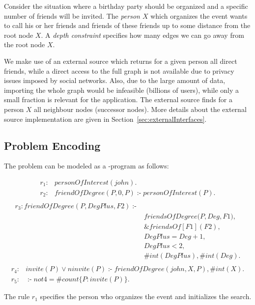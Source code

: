 \documentclass[14pt,a4paper, titlepage]{article}
\newcommand{\ext}[3]{\ensuremath{\&{#1}[#2](#3)}}
\DeclareMathOperator{\leftimpl}{:-}
\begin{document}
Consider the situation where a birthday party should be organized and a specific number of friends will
 be invited. The \emph{person $X$} which organizes the event wants to call his or her friends and friends of these friends up to some distance from the root node $X$. A \emph{depth constraint} specifies how many edges we can go away from the root node $X$.
 

We make use of an external source which returns for a given person all direct friends, while a direct access to the full graph is not available due to privacy issues imposed by social networks. Also, due to the large amount of data, importing the whole graph would be infeasible (billions of users), while only a small fraction is relevant for the application. The external source finds for a person $X$ all neighbour nodes (successor nodes). More details about the external source implementation are given in Section~\ref{sec:externalInterfaces}. 
               

\subsection{Problem Encoding}
The problem can be modeled as a \hex{}-program as follows:
\begin{exmp}
\begin{align*}
r_1\colon & \mathit{personOfInterest}(\mathit{john}). \\
r_2\colon & \mathit{friendOfDegree}(\mathit{P, 0, P}) \leftimpl  \mathit{personOfInterest}(P).\\
\end{align*}
\begin{align*}
r_{3}\colon \mathit{friendOfDegree}(\mathit{P, DegPlus, F2}) \leftimpl & \\  
& \mathit{friendsOfDegree}(\mathit{P,Deg,F1)},\\
& \ext{friendsOf}{F1}{F2},\\ 
& \mathit{DegPlus = Deg + 1}, \\
& \mathit{DegPlus < 2},\\
& \mathit{\#int(DegPlus)}, \mathit{\#int(Deg)}.\\
\end{align*}
\begin{align*}
r_{4}\colon & \mathit{invite(P)} \vee \mathit{ninvite(P) \leftimpl  friendOfDegree(john,X,P), \#int(X).}\\
r_{5}\colon & \leftimpl   \mathit{not} 4 = \mathit{\#count} \{ P : \mathit{invite(P)} \}.
\end{align*}
\end{exmp}
The rule $r_1$ specifies the person who organizes the event and initializes the search. 
\end{document}
